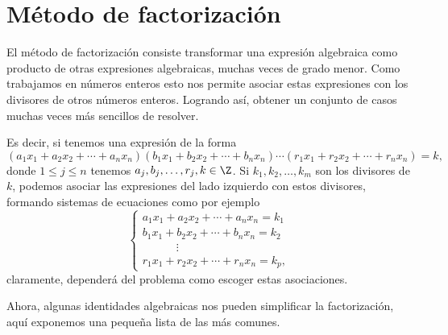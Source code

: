 \section{Método de factorización}

El método de factorización consiste transformar una expresión algebraica como producto de otras expresiones algebraicas, muchas veces de grado menor.
Como trabajamos en números enteros esto nos permite asociar estas expresiones con los divisores de otros números enteros.
Logrando así, obtener un conjunto de casos muchas veces más sencillos de resolver.

Es decir, si tenemos una expresión de la forma
\[
    (a_1 x_1 + a_2 x_2 + \cdots + a_n x_n)(b_1 x_1 + b_2 x_2 + \cdots + b_n x_n) \cdots (r_1 x_1 + r_2 x_2 + \cdots + r_n x_n) = k,
\]
donde $1 \leq j \leq n$ tenemos $a_j, b_j, \ldots, r_j, k \in \Z$.
Si $k_1, k_2, \ldots, k_m$ son los divisores de $k$, podemos asociar las expresiones del lado izquierdo con estos divisores, formando sistemas de ecuaciones como por ejemplo
\[
    \begin{cases}
        a_1 x_1 + a_2 x_2 + \cdots + a_n x_n = k_1\\
        b_1 x_1 + b_2 x_2 + \cdots + b_n x_n = k_2\\
        \quad \qquad \vdots\\
        r_1 x_1 + r_2 x_2 + \cdots + r_n x_n = k_p,
    \end{cases}
\]
claramente, dependerá del problema como escoger estas asociaciones.

Ahora, algunas identidades algebraicas nos pueden simplificar la factorización, aquí exponemos una pequeña lista de las más comunes.
\vspace{2mm}


